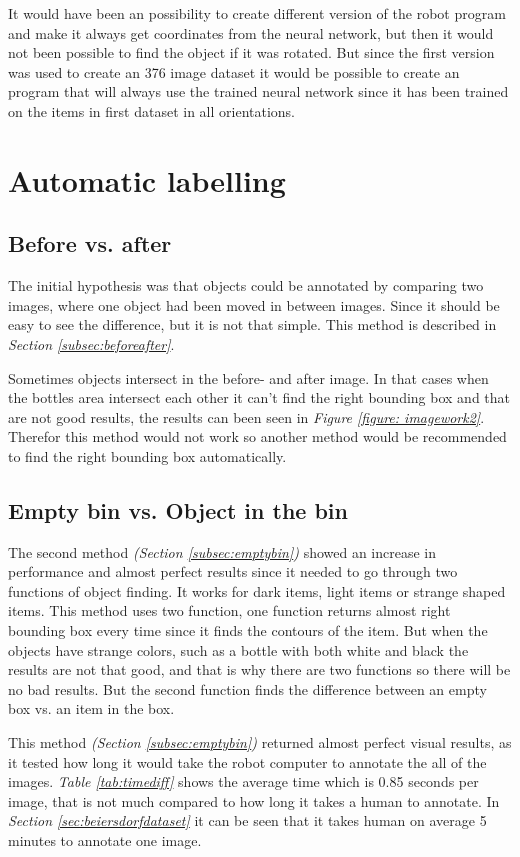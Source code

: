 It would have been an possibility to create different version of the robot program and make it always get coordinates from the neural network, but then it would not been possible to find the object if it was rotated. But since the first version was used to create an 376 image dataset it would be possible to create an program that will always use the trained neural network since it has been trained on the items in first dataset in all orientations.


\section{Automatic labelling}
\subsection{Before vs. after}
The initial hypothesis was that objects could be annotated by comparing two images, where one object had been moved in between images. Since it should be easy to see the difference, but it is not that simple. This method is described in \textit{Section \ref{subsec:beforeafter}}.

Sometimes objects intersect in the before- and after image. In that cases when the bottles area intersect each other it can't find the right bounding box and that are not good results, the results can been seen in \textit{Figure \ref{figure: imagework2}}. Therefor this method would not work so another method would be recommended to find the right bounding box automatically. 

\subsection{Empty bin vs. Object in the bin}
The second method \textit{(Section \ref{subsec:emptybin})} showed an increase in performance and almost perfect results since it needed to go through two functions of object finding. It works for dark items, light items or strange shaped items. This method uses two function, one function returns almost right bounding box every time since it finds the contours of the item. But when the objects have strange colors, such as a bottle with both white and black the results are not that good, and that is why there are two functions so there will be no bad results. But the second function finds the difference between an empty box vs. an item in the box.

This method \textit{(Section \ref{subsec:emptybin})} returned almost perfect visual results, as it tested how long it would take the robot computer to annotate the all of the images. \textit{Table \ref{tab:timediff}} shows the average time which is 0.85 seconds per image, that is not much compared to how long it takes a human to annotate. In \textit{Section \ref{sec:beiersdorfdataset}} it can be seen that it takes human on average 5 minutes to annotate one image.

